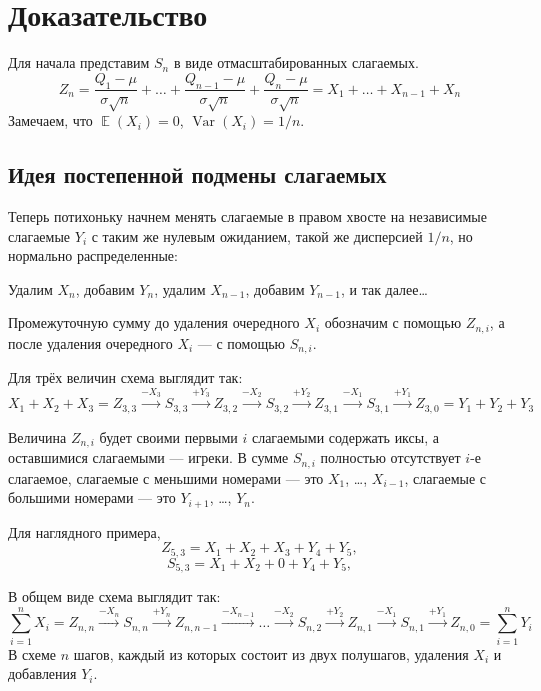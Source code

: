 \documentclass[
  letterpaper,
  DIV=11,
  numbers=noendperiod]{scrartcl}
\begin{document}
\section{Доказательство}\label{sec-clt-proof}

Для начала представим \(S_n\) в виде отмасштабированных слагаемых. \[
Z_n = \frac{Q_1 - \mu}{\sigma \sqrt n} + \ldots + \frac{Q_{n-1} - \mu}{\sigma \sqrt n} + \frac{Q_n - \mu}{\sigma \sqrt n} = X_1 + \ldots + X_{n-1} + X_n
\] Замечаем, что \(\mathop{\mathrm{\mathbb{E}}}(X_i) = 0\),
\(\mathop{\mathrm{Var}}(X_i) = 1/n\).

\subsection{Идея постепенной подмены слагаемых}\label{sec-swapping-idea}

Теперь потихоньку начнем менять слагаемые в правом хвосте на независимые
слагаемые \(Y_i\) с таким же нулевым ожиданием, такой же дисперсией
\(1/n\), но нормально распределенные:

Удалим \(X_n\), добавим \(Y_n\), удалим \(X_{n-1}\), добавим
\(Y_{n-1}\), и так далее\ldots{}

Промежуточную сумму до удаления очередного \(X_i\) обозначим с помощью
\(Z_{n,i}\), а после удаления очередного \(X_i\) --- с помощью
\(S_{n,i}\).

Для трёх величин схема выглядит так: \[
X_1 + X_2 + X_3 = Z_{3,3} \overset{-X_3}{\longrightarrow}S_{3,3}\overset{+Y_3}{\longrightarrow}Z_{3,2}\overset{-X_2}{\longrightarrow}S_{3,2}\overset{+Y_2}{\longrightarrow}Z_{3,1}\overset{-X_1}{\longrightarrow}S_{3,1}\overset{+Y_1}{\longrightarrow}Z_{3,0}=Y_1 + Y_2 + Y_3
\]

Величина \(Z_{n,i}\) будет своими первыми \(i\) слагаемыми содержать
иксы, а оставшимися слагаемыми --- игреки. В сумме \(S_{n,i}\) полностью
отсутствует \(i\)-е слагаемое, слагаемые с меньшими номерами --- это
\(X_1\), \ldots, \(X_{i-1}\), слагаемые с большими номерами --- это
\(Y_{i+1}\), \ldots, \(Y_n\).

Для наглядного примера, \[
Z_{5, 3} = X_1 + X_2 + X_3 + Y_4 + Y_5,
\] \[
S_{5, 3} = X_1 + X_2 + 0 + Y_4 + Y_5,
\]

В общем виде схема выглядит так: \[
\sum_{i=1}^n X_i = Z_{n,n} \overset{-X_n}{\longrightarrow}S_{n,n}\overset{+Y_n}{\longrightarrow}Z_{n,n-1}\overset{-X_{n-1}}{\longrightarrow} \ldots \overset{-X_2}{\longrightarrow}S_{n,2}\overset{+Y_2}{\longrightarrow}Z_{n,1}\overset{-X_1}{\longrightarrow}S_{n,1}\overset{+Y_1}{\longrightarrow}Z_{n,0}=\sum_{i=1}^n Y_i
\] В схеме \(n\) шагов, каждый из которых состоит из двух полушагов,
удаления \(X_i\) и добавления \(Y_i\).
\end{document}
